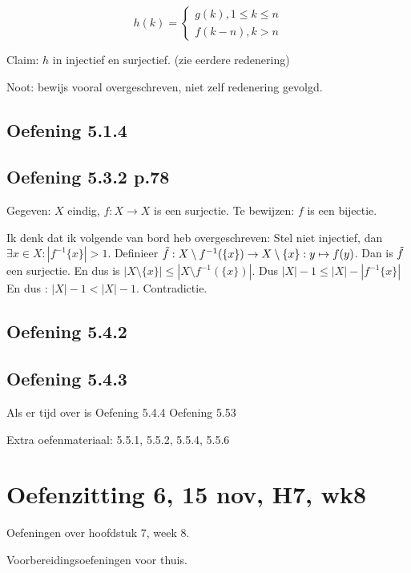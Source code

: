 \documentclass{article}
\begin{document}
\[ 
h(k)= \left\{ 
\begin{aligned}
g(k) , 1 \leq k \leq n \\
f(k-n) , k > n
\end{aligned} 
\right.\]

Claim: $h$ in injectief en surjectief. (zie eerdere redenering) 

Noot: bewijs vooral overgeschreven, niet zelf redenering gevolgd. 


\subsection{Oefening 5.1.4}

\subsection{Oefening 5.3.2 p.78}
Gegeven: $X$ eindig, $f:X \rightarrow X$ is een surjectie. Te bewijzen: $f$ is een bijectie. 

Ik denk dat ik volgende van bord heb overgeschreven: 
Stel niet injectief, dan $\exists x \in X: | f^{-1}\{x\}| > 1$. 
Definieer $\Tilde{f}: X \setminus f^{-1}(\{x\}) \to X \setminus \{ x \} : y \mapsto f(y)$. 
Dan is $\Tilde{f}$ een surjectie. En dus is $| X \setminus\{ x\} | \leq | X \setminus f^{-1}(\{ x \}) |$. 
Dus $| X| -1 \leq |X| - | f^{-1}\{ x\} |$
En dus : $|X| -1 < |X| -1$. Contradictie. 

\subsection{Oefening 5.4.2}

\subsection{Oefening 5.4.3}

Als er tijd over is
Oefening 5.4.4
Oefening 5.53 



Extra oefenmateriaal: 5.5.1, 5.5.2, 5.5.4, 5.5.6


\section*{Oefenzitting 6, 15 nov, H7, wk8}
Oefeningen over hoofdstuk 7, week 8. 

Voorbereidingsoefeningen voor thuis.
\end{document}
